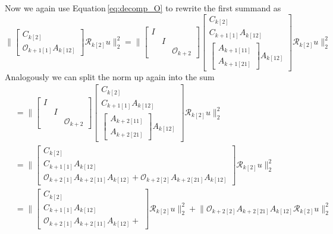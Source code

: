 \documentclass[numbers=noenddot,doctype=mastersthesis,BCOR=15mm,biblatex]{ldvbook}%
\newcommand{\R}{\mathcal{R}} %
\newcommand{\Ob}{\mathcal{O}} %
\newcommand{\eye}{I} %
\begin{document}
Now we again use Equation\,\ref{eq:decomp_O} to rewrite the first summand as 
\begin{equation}
\Big\|
\begin{bmatrix}
C_{k[2]}\\
\Ob_{k+1[1]}A_{k[12]}
\end{bmatrix}  \R_{k[2]} u
\Big\|_2^2
=
\Big\|
\begin{bmatrix}
\eye\\&\eye\\&&\Ob_{k+2}
\end{bmatrix}
\begin{bmatrix}
C_{k[2]}\\
C_{k+1[1]}A_{k[12]}\\
\begin{bmatrix}
A_{k+1[11]}\\
A_{k+1[21]}
\end{bmatrix}
A_{k[12]}
\end{bmatrix}  \R_{k[2]} u
\Big\|_2^2
\end{equation}
Analogously we can split the norm up again into the sum
\begin{align}
&=\Bigg\|
\begin{bmatrix}
\eye\\&\eye\\&&\Ob_{k+2}
\end{bmatrix}
\begin{bmatrix}
C_{k[2]}\\
C_{k+1[1]}A_{k[12]}\\
\begin{bmatrix}
A_{k+2[11]}\\
A_{k+2[21]}
\end{bmatrix}
A_{k[12]}
\end{bmatrix}  \R_{k[2]} u
\Bigg\|_2^2
\\
&=
\Bigg\|
\begin{bmatrix}
C_{k[2]}\\
C_{k+1[1]}A_{k[12]}\\
\Ob_{k+2[1]}A_{k+2[11]}A_{k[12]}+
\Ob_{k+2[2]}A_{k+2[21]}A_{k[12]}
\end{bmatrix}  \R_{k[2]} u
\Bigg\|_2^2
\\
&=
\Bigg\|
\begin{bmatrix}
C_{k[2]}\\
C_{k+1[1]}A_{k[12]}\\
\Ob_{k+2[1]}A_{k+2[11]}A_{k[12]}+
\end{bmatrix}  \R_{k[2]} u
\Bigg\|_2^2
+
\Big\|
\Ob_{k+2[2]}A_{k+2[21]}A_{k[12]}
\R_{k[2]} u
\Big\|_2^2
\end{align}
\end{document}
